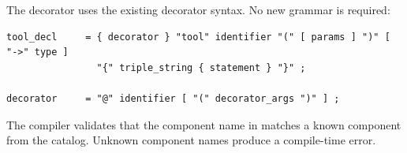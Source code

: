 The  decorator uses the existing decorator syntax. No new grammar is required:

\begin{lstlisting}[language=EBNF]
tool_decl     = { decorator } "tool" identifier "(" [ params ] ")" [ "->" type ]
                "{" triple_string { statement } "}" ;

decorator     = "@" identifier [ "(" decorator_args ")" ] ;
\end{lstlisting}

The compiler validates that the component name in  matches a known component from the catalog. Unknown component names produce a compile-time error.
